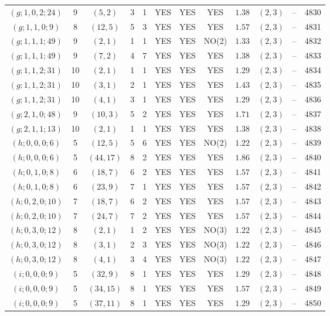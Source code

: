 \begin{longtable}{|c|c|c|c|c|c|c|c|c|c|c|c|}
$(g;1,0,2;24)$ & 9 & $(5,2)$ & 3 & 1 & YES & YES & YES & $1.38$ & $(2,3)$ & -- & 4830\\
$(g;1,1,0;9)$ & 8 & $(12,5)$ & 5 & 3 & YES & YES & YES & $1.57$ & $(2,3)$ & -- & 4831\\
$(g;1,1,1;49)$ & 9 & $(2,1)$ & 1 & 1 & YES & YES & NO(2) & $1.33$ & $(2,3)$ & -- & 4832\\
$(g;1,1,1;49)$ & 9 & $(7,2)$ & 4 & 7 & YES & YES & YES & $1.38$ & $(2,3)$ & -- & 4833\\
$(g;1,1,2;31)$ & 10 & $(2,1)$ & 1 & 1 & YES & YES & YES & $1.29$ & $(2,3)$ & -- & 4834\\
$(g;1,1,2;31)$ & 10 & $(3,1)$ & 2 & 1 & YES & YES & YES & $1.43$ & $(2,3)$ & -- & 4835\\
$(g;1,1,2;31)$ & 10 & $(4,1)$ & 3 & 1 & YES & YES & YES & $1.29$ & $(2,3)$ & -- & 4836\\
$(g;2,1,0;48)$ & 9 & $(10,3)$ & 5 & 2 & YES & YES & YES & $1.71$ & $(2,3)$ & -- & 4837\\
$(g;2,1,1;13)$ & 10 & $(2,1)$ & 1 & 1 & YES & YES & YES & $1.38$ & $(2,3)$ & -- & 4838\\
$(h;0,0,0;6)$ & 5 & $(12,5)$ & 5 & 6 & YES & YES & NO(2) & $1.22$ & $(2,3)$ & -- & 4839\\
$(h;0,0,0;6)$ & 5 & $(44,17)$ & 8 & 2 & YES & YES & YES & $1.86$ & $(2,3)$ & -- & 4840\\
$(h;0,1,0;8)$ & 6 & $(18,7)$ & 6 & 2 & YES & YES & YES & $1.57$ & $(2,3)$ & -- & 4841\\
$(h;0,1,0;8)$ & 6 & $(23,9)$ & 7 & 1 & YES & YES & YES & $1.57$ & $(2,3)$ & -- & 4842\\
$(h;0,2,0;10)$ & 7 & $(18,7)$ & 6 & 2 & YES & YES & YES & $1.57$ & $(2,3)$ & -- & 4843\\
$(h;0,2,0;10)$ & 7 & $(24,7)$ & 7 & 2 & YES & YES & YES & $1.57$ & $(2,3)$ & -- & 4844\\
$(h;0,3,0;12)$ & 8 & $(2,1)$ & 1 & 2 & YES & YES & NO(3) & $1.22$ & $(2,3)$ & -- & 4845\\
$(h;0,3,0;12)$ & 8 & $(3,1)$ & 2 & 3 & YES & YES & NO(3) & $1.22$ & $(2,3)$ & -- & 4846\\
$(h;0,3,0;12)$ & 8 & $(4,1)$ & 3 & 4 & YES & YES & NO(3) & $1.22$ & $(2,3)$ & -- & 4847\\
$(i;0,0,0;9)$ & 5 & $(32,9)$ & 8 & 1 & YES & YES & YES & $1.29$ & $(2,3)$ & -- & 4848\\
$(i;0,0,0;9)$ & 5 & $(34,15)$ & 8 & 1 & YES & YES & YES & $1.57$ & $(2,3)$ & -- & 4849\\
$(i;0,0,0;9)$ & 5 & $(37,11)$ & 8 & 1 & YES & YES & YES & $1.29$ & $(2,3)$ & -- & 4850\\

\end{longtable}
